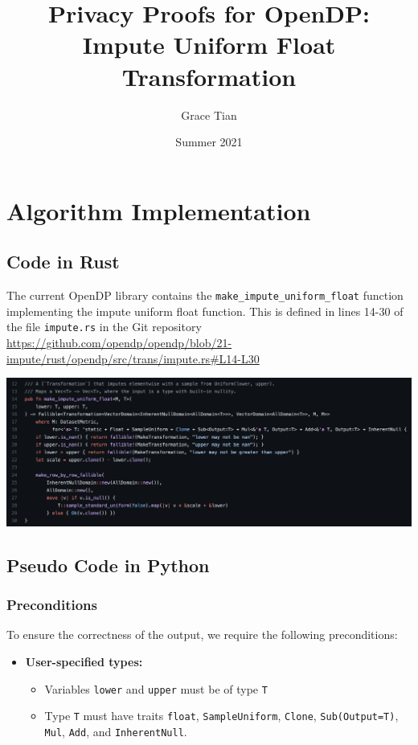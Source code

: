\documentclass[11pt,a4paper]{article}
\title{Privacy Proofs for OpenDP: Impute Uniform Float Transformation}
\author{Grace Tian}
\date{Summer 2021}
\newcommand{\grace}[1]{{ {\color{purple}{(grace)~#1}}}}
\newcommand{\T}{\texttt{T} }
\begin{document}
\maketitle
\tableofcontents

\section{Algorithm Implementation}
\subsection{Code in Rust}

The current OpenDP library contains the \texttt{make\_impute\_uniform\_float} function implementing the impute uniform float function. This is defined in lines 14-30 of the file \texttt{impute.rs} in the Git repository \url{https://github.com/opendp/opendp/blob/21-impute/rust/opendp/src/trans/impute.rs#L14-L30}



\includegraphics[width=\textwidth]{make_impute_unif_float.png}

\grace{Since there's arithmetic, it seems like we have to take into account rounding that might get added into the stability?}

\subsection{Pseudo Code in Python}

\subsubsection*{Preconditions}
To ensure the correctness of the output, we require the following preconditions:

\begin{itemize}
    \item \textbf{User-specified types:}
    \begin{itemize}
        \item Variables \texttt{lower} and \texttt{upper} must be of type \T
        \item Type \texttt{T} must have traits \texttt{float}, \texttt{SampleUniform}, \texttt{Clone}, \texttt{Sub(Output=T)}, \texttt{Mul}, \texttt{Add}, and \texttt{InherentNull}.
    \end{itemize}
\end{itemize}
\end{document}
